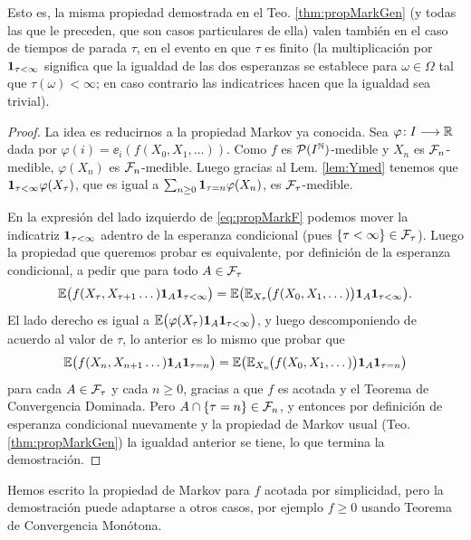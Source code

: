 Esto es, la misma propiedad demostrada en el Teo. \ref{thm:propMarkGen} (y todas las que le preceden, que son casos particulares de ella) valen también en el caso de tiempos de parada $\tau$, en el evento en que $\tau$ es finito (la multiplicación por $\mathbf{1}_{\tau<\infty}$ significa que la igualdad de las dos esperanzas se establece para $\omega\in\Omega$ tal que $\tau(\omega)<\infty$; en caso contrario las indicatrices hacen que la igualdad sea trivial).

\begin{proof}
La idea es reducirnos a la propiedad Markov ya conocida.
Sea $\varphi\!:I\longrightarrow\mathbb{R}$ dada por $\varphi(i)=\ee_i(f(X_0,X_1,\dotsc))$.
Como $f$ es $\mathcal{P}(I^{\mathbb{N}})$-medible y $X_n$ es $\mathcal{F}_n$-medible, $\varphi(X_n)$ es $\mathcal{F}_n$-medible.
Luego gracias al Lem. \ref{lem:Ymed} tenemos que $\mathbf{1}_{\tau<\infty}\varphi(X_\tau)$, que es igual a $\sum_{n\geq0}\mathbf{1}_{\tau=n}\varphi(X_n)$, es $\mathcal{F}_\tau$-medible.

En la expresión del lado izquierdo de \eqref{eq:propMarkF} podemos mover la indicatriz $\mathbf{1}_{\tau<\infty}$ adentro de la esperanza condicional (pues $\{\tau<\infty\}\in\mathcal{F}_\tau$).
Luego la propiedad que queremos probar es equivalente, por definición de la esperanza condicional, a pedir que para todo $A\in\mathcal{F}_\tau$
\[\mathbb{E}\big(f(X_{\tau},X_{\tau+1}\dotsc)\mathbf{1}_{A}\mathbf{1}_{\tau<\infty}\big)=\mathbb{E}\big(\mathbb{E}_{X_\tau}\hspace{-0.1em}\big(f(X_0,X_1,\dotsc)\big)\mathbf{1}_{A}\mathbf{1}_{\tau<\infty}\big).\]
El lado derecho es igual a $\mathbb{E}\big(\varphi(X_\tau)\mathbf{1}_{A}\mathbf{1}_{\tau<\infty}\big)$, y luego descomponiendo de acuerdo al valor de $\tau$, lo anterior es lo mismo que probar que 
\[\mathbb{E}\big(f(X_{n},X_{n+1}\dotsc)\mathbf{1}_{A}\mathbf{1}_{\tau=n}\big)=\mathbb{E}\big(\mathbb{E}_{X_n}\hspace{-0.1em}\big(f(X_0,X_1,\dotsc)\big)\mathbf{1}_{A}\mathbf{1}_{\tau=n}\big)\]
para cada $A\in\mathcal{F}_\tau$ y cada $n\geq0$, gracias a que $f$ es acotada y el Teorema de Convergencia Dominada.
Pero $A\cap\{\tau=n\}\in\mathcal{F}_n$, y entonces por definición de esperanza condicional nuevamente y la propiedad de Markov usual (Teo. \ref{thm:propMarkGen}) la igualdad anterior se tiene, lo que termina la demostración.
\end{proof}

\begin{rem}
Hemos escrito la propiedad de Markov para $f$ acotada por simplicidad, pero la demostración puede adaptarse a otros casos, por ejemplo $f\geq0$ usando Teorema de Convergencia Monótona.
\end{rem}

